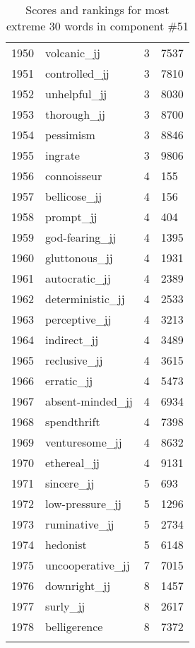\begin{longtable}[!htbp]{| rlr@{.}l |}
    1950 & volcanic\_jj & 3 & 7537 \\
    1951 & controlled\_jj & 3 & 7810 \\
    1952 & unhelpful\_jj & 3 & 8030 \\
    1953 & thorough\_jj & 3 & 8700 \\
    1954 & pessimism & 3 & 8846 \\
    1955 & ingrate & 3 & 9806 \\
    1956 & connoisseur & 4 & 155 \\
    1957 & bellicose\_jj & 4 & 156 \\
    1958 & prompt\_jj & 4 & 404 \\
    1959 & god-fearing\_jj & 4 & 1395 \\
    1960 & gluttonous\_jj & 4 & 1931 \\
    1961 & autocratic\_jj & 4 & 2389 \\
    1962 & deterministic\_jj & 4 & 2533 \\
    1963 & perceptive\_jj & 4 & 3213 \\
    1964 & indirect\_jj & 4 & 3489 \\
    1965 & reclusive\_jj & 4 & 3615 \\
    1966 & erratic\_jj & 4 & 5473 \\
    1967 & absent-minded\_jj & 4 & 6934 \\
    1968 & spendthrift & 4 & 7398 \\
    1969 & venturesome\_jj & 4 & 8632 \\
    1970 & ethereal\_jj & 4 & 9131 \\
    1971 & sincere\_jj & 5 & 693 \\
    1972 & low-pressure\_jj & 5 & 1296 \\
    1973 & ruminative\_jj & 5 & 2734 \\
    1974 & hedonist & 5 & 6148 \\
    1975 & uncooperative\_jj & 7 & 7015 \\
    1976 & downright\_jj & 8 & 1457 \\
    1977 & surly\_jj & 8 & 2617 \\
    1978 & belligerence & 8 & 7372 \\
    \hline
    \caption{Scores and rankings for most extreme 30 words in component \#51} \\
\end{longtable}
